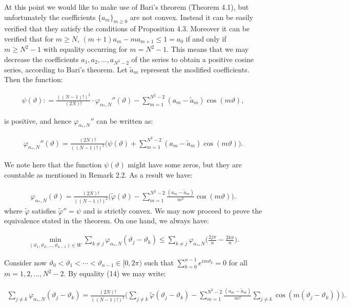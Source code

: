 \documentclass{amsart}[11pt]
\newcommand{\vphi}{\varphi}
\newcommand{\vth}{\vartheta}
\theoremstyle{definition}
\begin{document}
At this point we would like to make use of Bari's theorem (Theorem 4.1), but unfortunately the coefficients $\{ a_m \}_{m \geq 0}$ are not convex. Instead it can be easily verified that they satisfy the conditions of Proposition 4.3. Moreover it can be verified that for $m \geq N$, $(m+1)a_m - m a_{m+1} \leq 1 = a_0$ if and only if $m \geq N^2-1$ with equality occurring for $m=N^2-1$. This means that we may decrease the coefficients $a_1,a_2,\ldots, a_{N^2-2}$ of the series to obtain a positive cosine series, according to Bari's theorem. Let $\tilde{a}_m$ represent the modified coefficients. Then the function:

\begin{gather*}
\psi(\vth) : = \frac{((N-1)!)^2}{(2N)!} \cdot  \vphi_{\alpha_{\ast},N} ''(\vth) - \sum_{m=1}^{N^2-2}(a_m - \tilde{a}_m)\cos(m\vth),
\end{gather*}

is positive, and hence $\vphi_{\alpha_{\ast},N}''$ can be written as:

\begin{gather*}
    \vphi_{\alpha_{\ast},N}''(\vth) =  \frac{(2N)!}{((N-1)!)^2}\bigg( \psi(\vth) + \sum_{m=1}^{N^2-2}(a_m - \tilde{a}_m)\cos(m\vth) \bigg).
\end{gather*}

We note here that the function $\psi(\vth) $ might have some zeros, but they are countable as mentioned in Remark 2.2. As a result we have:

\begin{gather}
    \vphi_{\alpha_{\ast},N}(\vth) = \frac{(2N)!}{((N-1)!)^2}\bigg( \tilde{\vphi}(\vth) - \sum_{m=1}^{N^2-2}\frac{(a_m - \tilde{a}_m)}{m^2}\cos(m\vth) \bigg).
\end{gather}
where $\tilde{\vphi}$ satisfies $\tilde{\vphi}'' = \psi$ and is strictly convex. We may now proceed to prove the equivalence stated in the theorem. On one hand, we always have:

\begin{gather*}
         \min_{(\vth_1,\vth_2,\ldots,\vth_{n-1}) \in W}\sum_{k \neq j}  \vphi_{\alpha_{\ast},N}(\vth_j - \vth_k) \leq \sum_{k \neq j} \vphi_{\alpha_{\ast},N} \bigg( \frac{2j\pi}{n} - \frac{2k\pi}{n}\bigg).
\end{gather*}

Consider now $\vth_0 < \vth_1 < \cdots < \vth_{n-1} \in [0,2\pi)$ such that $\sum_{k=0}^{n-1}e^{im\vth_k} = 0 $ for all $m=1,2,\ldots,N^2-2$. By equality (14) we may write:

\begin{gather*}
    \sum_{j \neq k} \vphi_{\alpha_{\ast},N} (\vth_j - \vth_k) = \frac{(2N)!}{((N-1)!)^2}\bigg(\sum_{j \neq k} \tilde{\vphi}(\vth_j - \vth_k)  - \sum_{m=1}^{N^2-2}\frac{(a_m - \tilde{a}_m)}{m^2}\sum_{j \neq k}\cos(m(\vth_j-\vth_k))\bigg).
\end{gather*}
\end{document}
